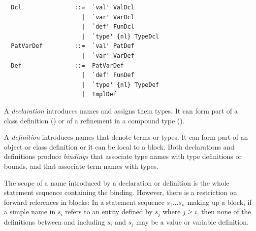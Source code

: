 \syntax\begin{lstlisting}
  Dcl               ::=  `val' ValDcl
                      |  `var' VarDcl
                      |  `def' FunDcl
                      |  `type' {nl} TypeDcl
  PatVarDef         ::=  `val' PatDef
                      |  `var' VarDef
  Def               ::=  PatVarDef
                      |  `def' FunDef
                      |  `type' {nl} TypeDef
                      |  TmplDef
\end{lstlisting}

A {\em declaration} introduces names and assigns them types. It can
form part of a class definition () or of a
refinement in a compound type ().

A {\em definition} introduces names that denote terms or types. It can
form part of an object or class definition or it can be local to a
block.  Both declarations and definitions produce {\em bindings} that
associate type names with type definitions or bounds, and that
associate term names with types.

The scope of a name introduced by a declaration or definition is the
whole statement sequence containing the binding.  However, there is a
restriction on forward references in blocks: In a statement sequence
$s_1 \ldots s_n$ making up a block, if a simple name in $s_i$ refers
to an entity defined by $s_j$ where $j \geq i$, then none of the
definitions between and including $s_i$ and $s_j$ may be a value or
variable definition.


